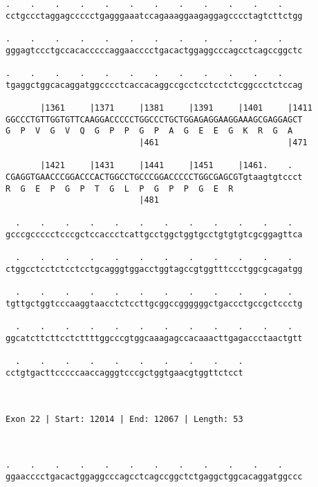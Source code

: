 \documentclass{article}
\begin{document}
\begin{Verbatim}
.    .    .    .    .    .    .    .    .    .    .    .    
cctgccctaggagccccctgagggaaatccagaaaggaagaggagcccctagtcttctgg
                                                            
.    .    .    .    .    .    .    .    .    .    .    .    
gggagtccctgccacacccccaggaacccctgacactggaggcccagcctcagccggctc
                                                            
.    .    .    .    .    .    .    .    .    .    .    .    
tgaggctggcacaggatggcccctcaccacaggccgcctcctcctctcggccctctccag
                                                            
       |1361     |1371     |1381     |1391     |1401     |1411
GGCCCTGTTGGTGTTCAAGGACCCCCTGGCCCTGCTGGAGAGGAAGGAAAGCGAGGAGCT
G  P  V  G  V  Q  G  P  P  G  P  A  G  E  E  G  K  R  G  A  
                           |461                          |471
  
       |1421     |1431     |1441     |1451     |1461.    .  
CGAGGTGAACCCGGACCCACTGGCCTGCCCGGACCCCCTGGCGAGCGTgtaagtgtccct
R  G  E  P  G  P  T  G  L  P  G  P  P  G  E  R              
                           |481                             
  
  .    .    .    .    .    .    .    .    .    .    .    .  
gcccgccccctcccgctccaccctcattgcctggctggtgcctgtgtgtcgcggagttca
                                                            
  .    .    .    .    .    .    .    .    .    .    .    .  
ctggcctcctctcctcctgcagggtggacctggtagccgtggtttccctggcgcagatgg
                                                            
  .    .    .    .    .    .    .    .    .    .    .    .  
tgttgctggtcccaaggtaacctctccttgcggccggggggctgaccctgccgctccctg
                                                            
  .    .    .    .    .    .    .    .    .    .    .    .  
ggcatcttcttcctcttttggcccgtggcaaagagccacaaacttgagaccctaactgtt
                                                            
  .    .    .    .    .    .    .    .    .    .
cctgtgacttcccccaaccagggtcccgctggtgaacgtggttctcct
                                                
                                                
 
Exon 22 | Start: 12014 | End: 12067 | Length: 53



.    .    .    .    .    .    .    .    .    .    .    .    
ggaacccctgacactggaggcccagcctcagccggctctgaggctggcacaggatggccc
                                                            

\end{Verbatim}
\end{document}
